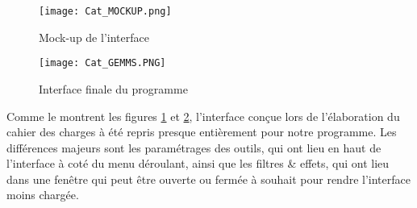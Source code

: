\begin{figure}[H]
	\caption{Mock-up de l'interface}
	\centering
	\texttt{[image: Cat\_MOCKUP.png]}
	\label{fig:cat_mockup}
\end{figure}

\begin{figure}[H]
	\caption{Interface finale du programme}
	\centering	
	\texttt{[image: Cat\_GEMMS.PNG]}
	\label{fig:cat_gemms}
\end{figure}

Comme le montrent les figures \ref{fig:cat_mockup} et \ref{fig:cat_gemms}, l'interface conçue lors de l'élaboration du cahier des charges à été repris presque entièrement pour notre programme. Les différences majeurs sont les paramétrages des outils, qui ont lieu en haut de l'interface à coté du menu déroulant, ainsi que les filtres \& effets, qui ont lieu dans une fenêtre qui peut être ouverte ou fermée à souhait pour rendre l'interface moins chargée. 
